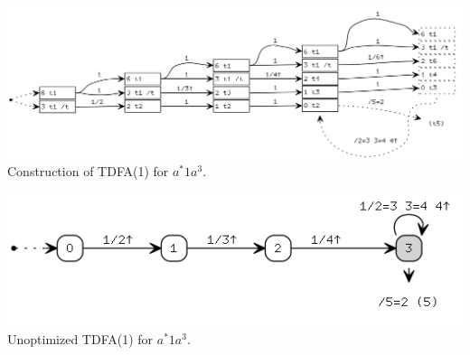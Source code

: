 \documentclass{article}
\theoremstyle{definition}
\begin{document}
\begin{multicols}{2}
\begin{center}
\end{center}
\begin{center}
\includegraphics[width=\linewidth]{img/example3/tdfa1_raw.png}\\
\footnotesize{Construction of TDFA(1) for $a^* 1 a^{3}$.} \\
\end{center}
\begin{center}
\includegraphics[width=0.8\linewidth]{img/example3/tdfa1.png}\\
\footnotesize{Unoptimized TDFA(1) for $a^* 1 a^{3}$.} \\
\end{center}


\end{multicols}
\end{document}
